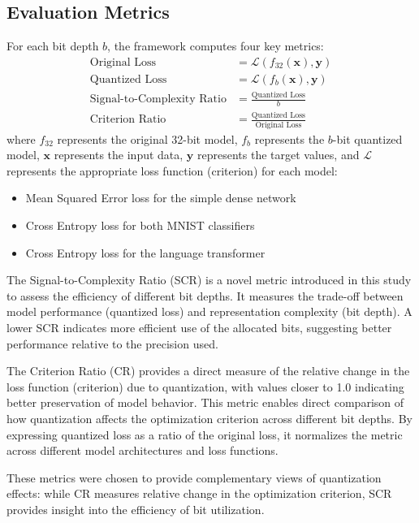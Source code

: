 \documentclass[twocolumn]{article}
\begin{document}
\subsection{Evaluation Metrics}
For each bit depth $b$, the framework computes four key metrics:
\begin{align}
\text{Original Loss} &= \mathcal{L}(f_{32}(\mathbf{x}), \mathbf{y}) \nonumber \\
\text{Quantized Loss} &= \mathcal{L}(f_b(\mathbf{x}), \mathbf{y}) \nonumber \\
\text{Signal-to-Complexity Ratio} &= \frac{\text{Quantized Loss}}{b} \nonumber \\
\text{Criterion Ratio} &= \frac{\text{Quantized Loss}}{\text{Original Loss}}
\end{align}
where $f_{32}$ represents the original 32-bit model, $f_b$ represents the $b$-bit quantized model, $\mathbf{x}$ represents the input data, $\mathbf{y}$ represents the target values, and $\mathcal{L}$ represents the appropriate loss function (criterion) for each model:
\begin{itemize}
\item Mean Squared Error loss for the simple dense network
\item Cross Entropy loss for both MNIST classifiers
\item Cross Entropy loss for the language transformer
\end{itemize}
The Signal-to-Complexity Ratio (SCR) is a novel metric introduced in this study
to assess the efficiency of different bit depths. It measures the trade-off
between model performance (quantized loss) and representation complexity (bit
depth). A lower SCR indicates more efficient use of the allocated bits,
suggesting better performance relative to the precision used.

The Criterion Ratio (CR) provides a direct measure of the relative change in the
loss function (criterion) due to quantization, with values closer to 1.0
indicating better preservation of model behavior. This metric enables direct
comparison of how quantization affects the optimization criterion across
different bit depths. By expressing quantized loss as a ratio of the original
loss, it normalizes the metric across different model architectures and loss
functions.

These metrics were chosen to provide complementary views of quantization
effects: while CR measures relative change in the optimization criterion, SCR
provides insight into the efficiency of bit utilization.




\printbibliography
\end{document}
